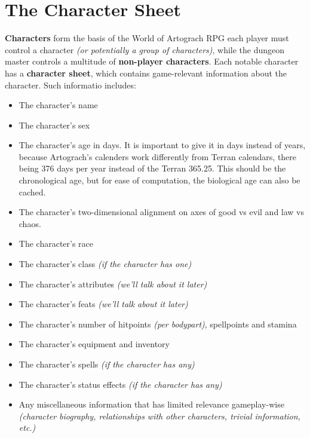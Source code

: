 \documentclass[openany,11pt,a4paper]{book}
\begin{document}
\chapter{The Character Sheet}
\textbf{Characters} form the basis of the World of Artograch RPG \textemdash each player must control a character \textit{(or potentially a group of characters)}, while the dungeon master controls a multitude of \textbf{non-player characters}. Each notable character has a \textbf{character sheet}, which contains game-relevant information about the character. Such informatio includes:
\begin{itemize}
\item The character's name
\item The character's sex
\item The character's age in days. It is important to give it in days instead of years, because Artograch's calenders work differently from Terran calendars, there being 376 days per year instead of the Terran 365.25. This should be the chronological age, but for ease of computation, the biological age can also be cached.
\item The character's two-dimensional alignment on axes of good vs evil and law vs chaos.
\item The character's race
\item The character's class \textit{(if the character has one)}
\item The character's attributes \textit{(we'll talk about it later)}
\item The character's feats \textit{(we'll talk about it later)}
\item The character's number of hitpoints \textit{(per bodypart)}, spellpoints and stamina
\item The character's equipment and inventory
\item The character's spells \textit{(if the character has any)}
\item The character's status effects \textit{(if the character has any)}
\item Any miscellaneous information that has limited relevance gameplay-wise \textit{(character biography, relationships with other characters, trivial information, etc.)}
\end{itemize}
\end{document}
